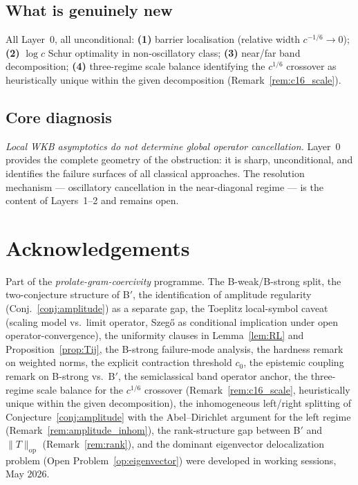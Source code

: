 \documentclass[12pt,a4paper]{article}
\begin{document}
\subsection*{What is genuinely new}
All Layer~0, all unconditional:
\textbf{(1)} barrier localisation (relative width $c^{-1/6}\to0$);
\textbf{(2)} $\log c$ Schur optimality in non-oscillatory class;
\textbf{(3)} near/far band decomposition;
\textbf{(4)} three-regime scale balance identifying the $c^{1/6}$
crossover as heuristically unique within the given decomposition
(Remark~\ref{rem:c16_scale}).

\subsection*{Core diagnosis}
\textit{Local WKB asymptotics do not determine global operator
cancellation.}
Layer~0 provides the complete geometry of the obstruction:
it is sharp, unconditional, and identifies the failure surfaces
of all classical approaches.
The resolution mechanism --- oscillatory cancellation in the
near-diagonal regime --- is the content of Layers~1--2
and remains open.

\section*{Acknowledgements}

Part of the \emph{prolate-gram-coercivity} programme.
The B-weak/B-strong split, the two-conjecture structure of B$'$,
the identification of amplitude regularity (Conj.~\ref{conj:amplitude})
as a separate gap, the Toeplitz local-symbol caveat
(scaling model vs.\ limit operator, Szeg\H{o} as conditional
implication under open operator-convergence), the uniformity
clauses in Lemma~\ref{lem:RL} and Proposition~\ref{prop:Tij},
the B-strong failure-mode analysis, the hardness remark on
weighted norms, the explicit contraction threshold $c_0$,
the epistemic coupling remark on B-strong vs.\ B$'$,
the semiclassical band operator anchor,
the three-regime scale balance for the $c^{1/6}$ crossover
(Remark~\ref{rem:c16_scale}, heuristically unique within the
given decomposition),
the inhomogeneous left/right splitting of Conjecture~\ref{conj:amplitude}
with the Abel--Dirichlet argument for the left regime
(Remark~\ref{rem:amplitude_inhom}),
the rank-structure gap between B$'$ and $\|T\|_{\mathrm{op}}$
(Remark~\ref{rem:rank}),
and the dominant eigenvector delocalization problem
(Open Problem~\ref{op:eigenvector})
were developed in working sessions, May 2026.
\end{document}

